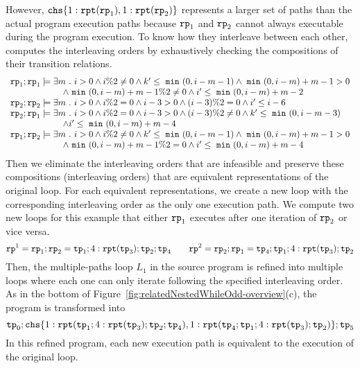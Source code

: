 However, $\rpchoose{1: \rprepeat(\rprog_1), 1:\rprepeat(\rprog_2)}$ represents a larger set of paths than the actual program execution paths because $\mathtt{rp}_1 $ and $\mathtt{rp}_2$ cannot always executable during the program execution.
To know how they interleave between each other, computes the interleaving orders
by exhaustively checking the compositions of their transition relations.
\begin{equation}
    \begin{array}{l}
        \mathtt{rp}_1 ; \mathtt{rp}_1 \models 
        \exists m ~.~  i > 0 \land  i \%2 \neq 0 \land k' \leq ~\mathtt{min}~(0, i - m - 1) \land ~\mathtt{min}~(0, i - m) + m - 1 > 0 \\
            \qquad \qquad \qquad \land ~\mathtt{min}~(0, i - m) + m - 1 \% 2 \neq 0 \land i' \leq  ~\mathtt{min}~(0, i - m) + m - 2 \\
        \mathtt{rp}_2 ; \mathtt{rp}_2 \models \exists m ~.~  i > 0 \land  i \%2 = 0 \land i - 3 > 0 \land (i - 3) \% 2 = 0 \land i' \leq i - 6  \\
        \mathtt{rp}_2 ; \mathtt{rp}_1 \models \exists m ~.~  i > 0 \land  i \%2 = 0 \land i - 3 > 0 \land (i - 3) \%2 \neq 0 \land k' \leq ~\mathtt{min}~(0, i - m - 3) \\
        \qquad \qquad \qquad 
        \land i' \leq ~\mathtt{min}~(0, i - m) + m - 4 \\
        \mathtt{rp}_1 ; \mathtt{rp}_2 \models \exists m ~.~  i > 0 \land  i \%2 \neq 0 \land k' \leq ~\mathtt{min}~(0, i - m - 1) \land ~\mathtt{min}~(0, i - m) + m - 1 > 0 \\
        \qquad \qquad \qquad \land ~\mathtt{min}~(0, i - m) + m - 1 \% 2 = 0 \land i' \leq  ~\mathtt{min}~(0, i - m) + m - 4
    \end{array}
\end{equation}
Then we eliminate the interleaving orders that are infeasible and preserve these compositions (interleaving orders) that are equivalent
representations of the original loop.
For each equivalent representations, we create a new loop with the corresponding interleaving order as the only one execution path.
We compute two new loops for this example that
either $\mathtt{rp}_1$ executes after one iteration of $\mathtt{rp}_2$ or vice versa.
\[
    \mathtt{rp}^1 = \mathtt{rp}_1 ; \mathtt{rp}_2 = \mathtt{tp}_1; 4:\mathtt{rpt}(\mathtt{tp}_3); \mathtt{tp}_2; \mathtt{tp}_4
    \qquad
    \mathtt{rp}^2 = \mathtt{rp}_2 ; \mathtt{rp}_1 = \mathtt{tp}_4; \mathtt{tp}_1; 4:\mathtt{rpt}(\mathtt{tp}_3); \mathtt{tp}_2
\]
Then, the multiple-paths loop $L_1$ in the source program is refined
into multiple loops where each one can only iterate following the specified interleaving order.
As in the bottom of Figure~\ref{fig:relatedNestedWhileOdd-overview}(c),
the program is transformed into 
\[
    \tpath_0 ; \rpchoose{ 1: \rprepeat(\tpath_1; 4:\rprepeat(\tpath_3); \tpath_2; \tpath_4), 
1: \rprepeat(\tpath_4; \tpath_1; 4:\rprepeat(\tpath_3); \tpath_2) }; \tpath_5
\]
In this refined program, 
each new execution path is equivalent to the execution of the original loop. 

